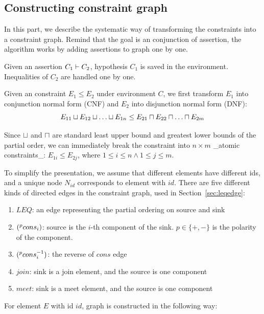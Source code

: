 \subsection{Constructing constraint graph}
\label{sec:consgraph}

In this part, we describe the systematic way of transforming the constraints
into a constraint graph. Remind that the goal is an conjunction of assertion,
the algorithm works by adding assertions to graph one by one.

Given an assertion $C_1 \vdash C_2$, hypothesis $C_1$ is saved in the
environment. Inequalities of $C_2$ are handled one by one.

Given an constraint $E_1 \leq E_2$ under environment $C$, we first transform
$E_1$ into conjunction normal form (CNF) and $E_2$ into disjunction normal form
(DNF): 
\[E_{11}\join E_{12} \join \dots \join E_{1n} \leq E_{21}\meet E_{22}
\meet \dots \meet E_{2m}\]

Since $\sqcup$ and $\sqcap$ are standard least upper bound and greatest lower
bounds of the partial order, we can immediately break the constraint into
$n\times m$ _atomic constraints_: $E_{1i}\leq E_{2j}$, where $1\leq i\leq n
\land 1\leq j\leq m$.

To simplify the presentation, we assume that different elements have different
ids, and a unique node $N_{id}$ corresponds to element with $id$. There are
five different kinds of directed edges in the constraint graph, used in
Section~\ref{sec:leqedge}:

\begin{enumerate}
\item $LEQ$: an edge representing the partial ordering on source and sink

\item $(^{p}cons_i)$: source is the $i$-th component of the sink. $p\in
\{+,-\}$ is the polarity of the component.

\item $(^{p}cons_i^{-1})$: the reverse of $cons$ edge

\item $join$: sink is a join element, and the source is one component

\item $meet$: sink is a meet element, and the source is one component

\end{enumerate}

For element $E$ with id $id$, graph is constructed in the following way:

